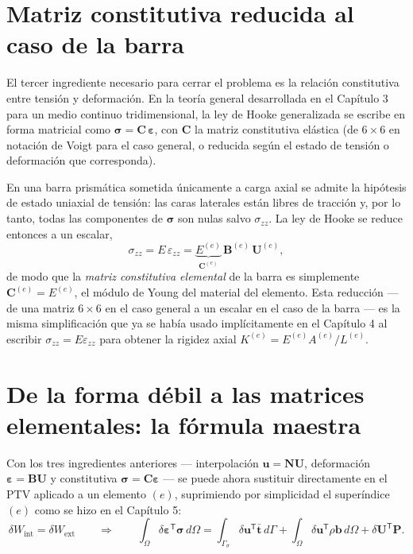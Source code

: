 \section{Matriz constitutiva reducida al caso de la barra}

El tercer ingrediente necesario para cerrar el problema es la relación constitutiva entre tensión y deformación. En la teoría general desarrollada en el Capítulo 3 para un medio continuo tridimensional, la ley de Hooke generalizada se escribe en forma matricial como $\bm\sigma = \bm C\,\bm\varepsilon$, con $\bm C$ la matriz constitutiva elástica (de $6\times 6$ en notación de Voigt para el caso general, o reducida según el estado de tensión o deformación que corresponda).

En una barra prismática sometida únicamente a carga axial se admite la hipótesis de estado uniaxial de tensión: las caras laterales están libres de tracción y, por lo tanto, todas las componentes de $\bm\sigma$ son nulas salvo $\sigma_{zz}$. La ley de Hooke se reduce entonces a un escalar,
\[
\sigma_{zz} = E\,\varepsilon_{zz} = \underbrace{E^{(e)}}_{\bm C^{(e)}} \, \bm B^{(e)}\, \bm U^{(e)} ,
\]
de modo que la \emph{matriz constitutiva elemental} de la barra es simplemente $\bm C^{(e)} = E^{(e)}$, el módulo de Young del material del elemento. Esta reducción --- de una matriz $6\times 6$ en el caso general a un escalar en el caso de la barra --- es la misma simplificación que ya se había usado implícitamente en el Capítulo 4 al escribir $\sigma_{zz} = E\varepsilon_{zz}$ para obtener la rigidez axial $K^{(e)} = E^{(e)}A^{(e)}/L^{(e)}$.

\section{De la forma débil a las matrices elementales: la fórmula maestra}
\label{sec:cap06-formula-maestra}

Con los tres ingredientes anteriores --- interpolación $\bm u = \bm N \bm U$, deformación $\bm\varepsilon = \bm B \bm U$ y constitutiva $\bm\sigma = \bm C \bm\varepsilon$ --- se puede ahora sustituir directamente en el PTV aplicado a un elemento $(e)$, suprimiendo por simplicidad el superíndice $(e)$ como se hizo en el Capítulo 5:
\[
\delta W_{\text{int}} = \delta W_{\text{ext}} \qquad \Longrightarrow \qquad
\int_\Omega \delta\bm\varepsilon^{\mathsf T} \bm\sigma \, d\Omega = \int_{\Gamma_\sigma} \delta\bm u^{\mathsf T} \bar{\bm t} \, d\Gamma + \int_\Omega \delta\bm u^{\mathsf T} \rho \bm b \, d\Omega + \delta \bm U^{\mathsf T} \bm P .
\]

